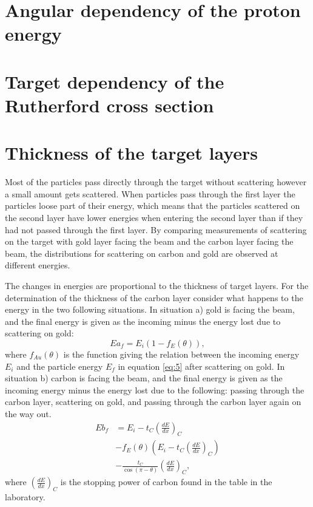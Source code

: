 \section{Angular dependency of the proton energy}

\section{Target dependency of the Rutherford cross section}

\section{Thickness of the target layers} 
Most of the particles pass directly through the target without scattering however a small amount gets scattered. When particles pass through the first layer the particles loose part of their energy, which means that the particles scattered on the second layer have lower energies when entering the second layer than if they had not passed through the first layer. By comparing measurements of scattering on the target with gold layer facing the beam and the carbon layer facing the beam, the distributions for scattering on carbon and gold are observed at different energies. 

The changes in energies are proportional to the thickness of target layers. For the determination of the thickness of the carbon layer consider what happens to the energy in the two following situations. In situation a) gold is facing the beam, and the final energy is given as the incoming minus the energy lost due to scattering on gold:
\begin{equation*}
Ea_f = E_i (1-f_E(\theta)), 
\end{equation*}
where $f_{Au}(\theta)$ is the function giving the relation between the incoming energy $E_i$ and the particle energy $E_f$ in equation \cref{eq:5} after scattering on gold. 
In situation b) carbon is facing the beam, and the final energy is given as the incoming energy minus the energy lost due to the following: passing through the carbon layer, scattering on gold, and passing through the carbon layer again on the way out. 
\begin{align*}
Eb_f &= E_i - t_C \left(\frac{dE}{dx}\right)_C 
\\ &- f_E(\theta) \left(E_i - t_C \left(\frac{dE}{dx}\right)_C \right) \\ &- \frac{t_C}{\cos(\pi-\theta)} \left(\frac{dE}{dx}\right)_C, 
\end{align*}
where $\left(\frac{dE}{dx}\right)_C$ is the stopping power of carbon found in the table in the laboratory.

